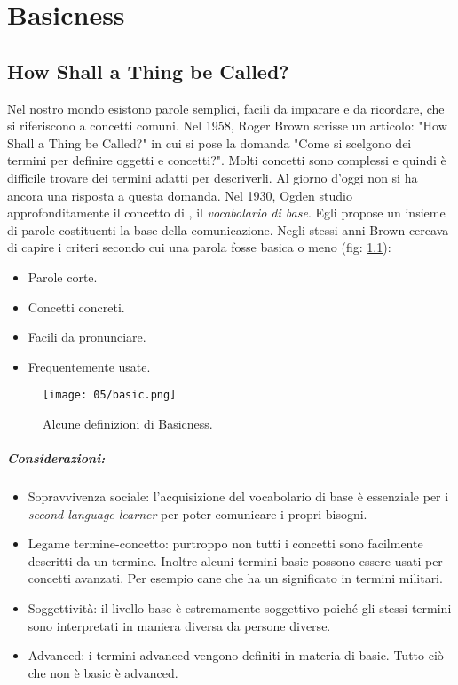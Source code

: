 \chapter{Basicness}
\section{How Shall a Thing be Called?}

Nel nostro mondo esistono parole semplici, facili da imparare e da ricordare, che si riferiscono a concetti comuni. Nel 1958, Roger Brown scrisse un articolo: "How Shall a Thing be Called?" in cui si pose la domanda "Come si scelgono dei termini per definire oggetti e concetti?". Molti concetti sono complessi e quindi è difficile trovare dei termini adatti per descriverli. Al giorno d'oggi non si ha ancora una risposta a questa domanda. Nel 1930, Ogden studio approfonditamente il concetto di , il \textit{vocabolario di base}. Egli propose un insieme di parole costituenti la base della comunicazione. Negli stessi anni Brown cercava di capire i criteri secondo cui una parola fosse basica o meno (fig: \ref{fig:bas}):

\begin{itemize}
  \item Parole corte. 
  \item Concetti concreti. 
  \item Facili da pronunciare. 
  \item Frequentemente usate. 
\end{itemize}
\begin{figure}[h]
    \centering
    \texttt{[image: 05/basic.png]}
    \caption{Alcune definizioni di Basicness.}
    \label{fig:bas}
\end{figure}

\paragraph{Considerazioni:}

\begin{itemize}
  \item Sopravvivenza sociale: l'acquisizione del vocabolario di base è essenziale per i \textit{second language learner} per poter comunicare i propri bisogni. 
  \item Legame termine-concetto: purtroppo non tutti i concetti sono facilmente descritti da un termine. Inoltre alcuni termini basic possono essere usati per concetti avanzati. Per esempio cane che ha un significato in termini militari. 
  \item Soggettività: il livello base è estremamente soggettivo poiché gli stessi termini sono interpretati in maniera diversa da persone diverse. 
  \item Advanced: i termini advanced vengono definiti in materia di basic. Tutto ciò che non è basic è advanced. 
\end{itemize}








